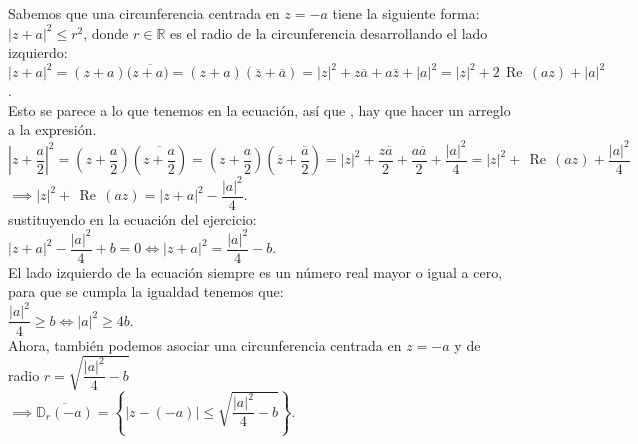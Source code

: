 \documentclass[twoside]{book}
\renewcommand{\Re}{\,\operatorname{Re}\,}
\begin{document}
\begin{sol}
    \begin{solucion}{}
        Sabemos que una circunferencia centrada en $z=-a$ tiene la siguiente forma:\\
        $|z+a|^2\leq r^2$, donde $r\in\mathbb{R}$ es el radio de la circunferencia desarrollando el lado izquierdo:\\
        $|z+a|^2=(z+a)(\overline{z+a)}=(z+a)(\overline{z}+\overline{a})=|z|^2+z\overline{a}+a\overline{z}+|a|^2=|z|^2+2\Re(az)+|a|^2$.\\
        Esto se parece  a lo que tenemos en la ecuaci\'on, as\'i que , hay que hacer un arreglo a la expresi\'on.\\
        $\left|z+\dfrac{a}{2}\right|^2=\left(z+\dfrac{a}{2}\right)\left(\overline{z+\dfrac{a}{2}}\right)=\left(z+\dfrac{a}{2}\right)\left(\overline{z}+\overline{\dfrac{a}{2}}\right)=|z|^2+\dfrac{z\overline{a}}{2}+\dfrac{a\overline{a}}{2}+\dfrac{|a|^2}{4}=|z|^2+\Re(az)+\dfrac{|a|^2}{4}$\\
        $\implies |z|^2+\Re(az)=|z+a|^2-\dfrac{|a|^2}{4}.$\\
        sustituyendo en la ecuaci\'on del ejercicio:\\
        $|z+a|^2-\dfrac{|a|^2}{4}+b=0\iff |z+a|^2=\dfrac{|a|^2}{4}-b.$\\
        El lado izquierdo de la ecuaci\'on siempre es un n\'umero real mayor o igual a cero, para que se cumpla la igualdad tenemos que:\\
        $\dfrac{|a|^2}{4}\geq b\iff|a|^2\geq4b.$\\
        Ahora, tambi\'en podemos asociar una circunferencia centrada en $z=-a$ y de radio $r=\sqrt{\dfrac{|a|^2}{4}-b}$\\
        $\implies\overline{\mathbb{D}_r(-a)}=\left\{|z-(-a)|\leq\sqrt{\dfrac{|a|^2}{4}-b}\right\}.$

    \end{solucion}
\end{sol}
\end{document}
